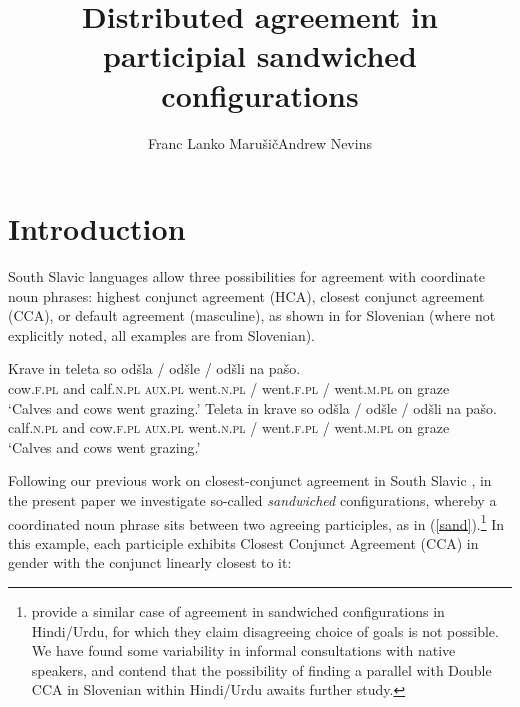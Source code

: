 \documentclass[output=paper
,modfonts
,nonflat]{langsci/langscibook}
\title{Distributed agreement in participial sandwiched configurations}
\author{Franc Lanko Marušič\affiliation{University of Nova Gorica}\lastand Andrew Nevins\affiliation{University College London}}
\begin{document}
\maketitle
\section{Introduction} 

South Slavic languages allow three possibilities for agreement with coordinate noun phrases: highest conjunct agreement (HCA), closest conjunct agreement (CCA), or default agreement (masculine), as shown in  for Slovenian (where not explicitly noted, all examples are from Slovenian).

\begin{exe}
\ex \label{initial}
\gll Krave in teleta so odšla / odšle / odšli na pašo.\\
cow.\textsc{f.pl} and calf.\textsc{n.pl} \textsc{aux.pl} went.\textsc{n.pl} / went.\textsc{f.pl} / went.\textsc{m.pl} on graze\\
\glt `Calves and cows went grazing.'
\ex \label{initial2}
\gll Teleta in krave so odšla / odšle / odšli na pašo.\\
calf.\textsc{n.pl} and cow.\textsc{f.pl} \textsc{aux.pl} went.\textsc{n.pl} / went.\textsc{f.pl} / went.\textsc{m.pl} on graze\\
\glt `Calves and cows went grazing.'
\end{exe}
Following our previous work on closest-conjunct agreement in South Slavic \citep{marusicnevinssaksida:07,marusicnevinsbadecker:15,willergold:16}, in the present paper we investigate so-called \textit{sandwiched} configurations, whereby a coordinated noun phrase sits between two agreeing participles, as in (\ref{sand}).\footnote{\citet{bhattwalkow:13} provide a similar case of agreement in sandwiched configurations in Hindi/Urdu, for which they claim disagreeing choice of goals is not possible. We have found some variability in informal consultations with native speakers, and contend that the possibility of finding a parallel with Double CCA in Slovenian within Hindi/Urdu awaits further study.} In this example, each participle exhibits Closest Conjunct Agreement (CCA) in gender with the conjunct linearly closest to it:
\end{document}
